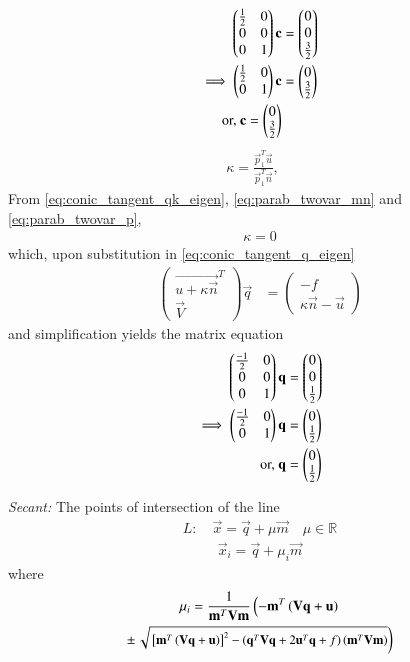 \documentclass[journal,12pt,twocolumn]{IEEEtran}
\begin{document}
\begin{align}
\begin{pmatrix}\frac{1}{2} & 0 \\ 0 & 0 \\ 0 & 1\end{pmatrix}\mathbf{c} &= \begin{pmatrix}0 \\ 0\\\frac{3}{2}\end{pmatrix} 
\\
\implies 
\begin{pmatrix}\frac{1}{2} & 0 \\  0 & 1\end{pmatrix}\mathbf{c} &= \begin{pmatrix}0 \\ \frac{3}{2}\end{pmatrix} 
\\
\text{or, } \mathbf{c} = \begin{pmatrix}0\\\frac{3}{2}\end{pmatrix}
\end{align}
\begin{align}
\label{eq:conic_tangent_qk_eigen} \kappa = \frac{\vec{p}_1^T\vec{u}}{\vec{p}_1^T\vec{n}}, \quad 
\end{align}
From \eqref{eq:conic_tangent_qk_eigen}, \eqref{eq:parab_twovar_mn} and \eqref{eq:parab_twovar_p},
\begin{align}
\kappa = 0
\end{align}
which, upon substitution in  \eqref{eq:conic_tangent_q_eigen}
\begin{align}
\label{eq:conic_tangent_q_eigen}
\begin{pmatrix}
\vec{u+\kappa \vec{n}}^T \\ \vec{V}
\end{pmatrix}
\vec{q} &= 
\begin{pmatrix}
-f
\\
\kappa\vec{n}-\vec{u}
\end{pmatrix}
\end{align}
and simplification yields the matrix equation
\begin{align}
\begin{pmatrix}\frac{-1}{2} & 0 \\0 & 0\\0&1\end{pmatrix}\mathbf{q} &= \begin{pmatrix}0\\0\\\frac{1}{2}\end{pmatrix}
\\
\implies \begin{pmatrix}\frac{-1}{2} & 0\\0&1\end{pmatrix}\mathbf{q} &= \begin{pmatrix}0\\\frac{1}{2}\end{pmatrix}
\\
\text{or, } \mathbf{q} &= \begin{pmatrix}0 \\\frac{1}{2}\end{pmatrix}
\end{align}
\item 
{\em Secant: }The points of intersection of the line 
\begin{align}
L: \quad \vec{x} = \vec{q} + \mu \vec{m} \quad \mu \in \mathbb{R}
\label{eq:conic_tangent}
\end{align}
\begin{align}\label{eq:parametricform}
\vec{x}_i = \vec{q} + \mu_i \vec{m}
\end{align}
%
where
\begin{multline}
\mu_i = \frac{1}
{
\mathbf{m}^T\mathbf{V}\mathbf{m}
}
\left(-\mathbf{m}^T\left(\mathbf{V}\mathbf{q}+\mathbf{u}\right)\right.
\\
\pm
{\small
\ensuremath{\left.\sqrt{
{}\left[
\mathbf{m}^T\left(\mathbf{V}\mathbf{q}+\mathbf{u}\right)
\right]^2
-
\left(
\mathbf{q}^T\mathbf{V}\mathbf{q} + 2\mathbf{u}^T\mathbf{q} +f
\right)
\left(\mathbf{m}^T\mathbf{V}\mathbf{m}\right)
}
\right)}
}
\label{eq:tangent_roots}
\end{multline}
                    
\end{document}
